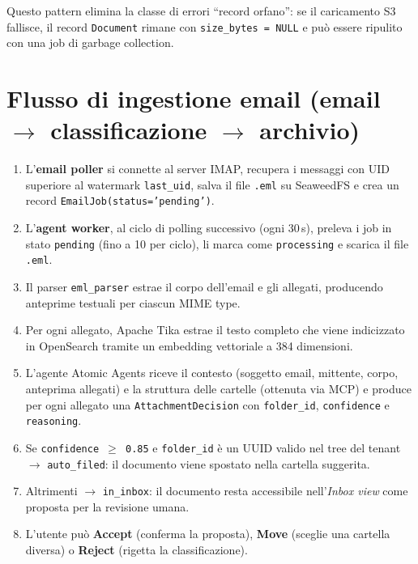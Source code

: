 Questo pattern elimina la classe di errori ``record orfano'': se il caricamento S3 fallisce,
il record \texttt{Document} rimane con \texttt{size\_bytes = NULL} e pu\`o essere
ripulito con una job di garbage collection.

\section{Flusso di ingestione email (email $\rightarrow$ classificazione $\rightarrow$ archivio)}
\label{sec:email_flow}

\begin{enumerate}[leftmargin=*]
    \item L'\textbf{email poller} si connette al server IMAP, recupera i messaggi con
          UID superiore al watermark \texttt{last\_uid}, salva il file \texttt{.eml}
          su SeaweedFS e crea un record \texttt{EmailJob(status='pending')}.
    \item L'\textbf{agent worker}, al ciclo di polling successivo (ogni 30\,s), preleva
          i job in stato \texttt{pending} (fino a 10 per ciclo), li marca come
          \texttt{processing} e scarica il file \texttt{.eml}.
    \item Il parser \texttt{eml\_parser} estrae il corpo dell'email e gli allegati,
          producendo anteprime testuali per ciascun MIME type.
    \item Per ogni allegato, Apache Tika estrae il testo completo che viene indicizzato
          in OpenSearch tramite un embedding vettoriale a 384 dimensioni.
    \item L'agente Atomic Agents riceve il contesto (soggetto email, mittente, corpo,
          anteprima allegati) e la struttura delle cartelle (ottenuta via MCP) e produce
          per ogni allegato una \texttt{AttachmentDecision} con \texttt{folder\_id},
          \texttt{confidence} e \texttt{reasoning}.
    \item Se \texttt{confidence $\geq$ 0.85} e \texttt{folder\_id} \`e un UUID valido
          nel tree del tenant $\rightarrow$ \texttt{auto\_filed}: il documento viene
          spostato nella cartella suggerita.
    \item Altrimenti $\rightarrow$ \texttt{in\_inbox}: il documento resta accessibile
          nell'\emph{Inbox view} come proposta per la revisione umana.
    \item L'utente pu\`o \textbf{Accept} (conferma la proposta), \textbf{Move} (sceglie
          una cartella diversa) o \textbf{Reject} (rigetta la classificazione).
\end{enumerate}
